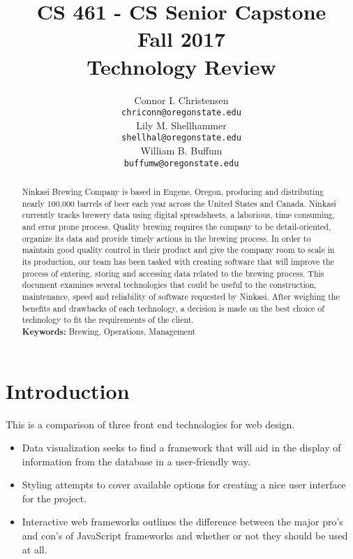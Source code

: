 \documentclass[draftclsnofoot,onecolumn,letterpaper,10pt,compsoc]{IEEEtran}
\title{CS 461 - CS Senior Capstone
	\\Fall 2017
	\\Technology Review
}
\author{
	Connor I. Christensen \\
	\texttt{chriconn@oregonstate.edu}
	\\
	Lily M. Shellhammer \\
	\texttt{shellhal@oregonstate.edu}
	\\
	William B. Buffum \\
	\small{}
	\texttt{buffumw@oregonstate.edu}
}
\begin{document}
\begin{titlingpage}
    \maketitle
    \begin{abstract}
			Ninkasi Brewing Company is based in Eugene, Oregon, producing and distributing nearly 100,000 barrels of beer each year across the United States and Canada.
			Ninkasi currently tracks brewery data using digital spreadsheets, a laborious, time consuming, and error prone process.
			Quality brewing requires the company to be detail-oriented, organize its data and provide timely actions in the brewing process.
			In order to maintain good quality control in their product and give the company room to scale in its production, our team has been tasked with creating software that will improve the process of entering, storing and accessing data related to the brewing process.
			This document examines several technologies that could be useful to the construction, maintenance, speed and reliability of software requested by Ninkasi.
			After weighing the benefits and drawbacks of each technology, a decision is made on the best choice of technology to fit the requirements of the client.
			\\
			\textbf{Keywords:} Brewing, Operations, Management
    \end{abstract}
		\pagebreak
		\tableofcontents
\end{titlingpage}

\section{Introduction}

  This is a comparison of three front end technologies for web design.
  \begin{itemize}
    \item Data visualization seeks to find a framework that will aid in the display of information from the database in a user-friendly way.
    \item Styling attempts to cover available options for creating a nice user interface for the project.
    \item Interactive web frameworks outlines the difference between the major pro's and con's of JavaScript frameworks and whether or not they should be used at all.
  \end{itemize}
\end{document}
